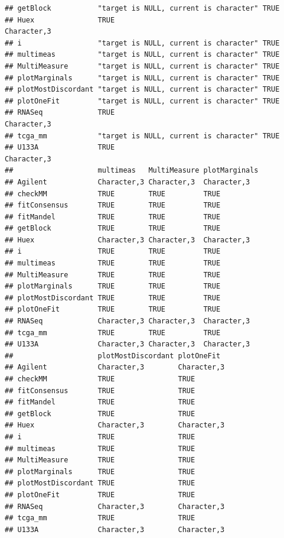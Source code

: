 \documentclass{article}\usepackage[]{graphicx}\usepackage[]{color}
\makeatletter
\newenvironment{kframe}{%
 \def\at@end@of@kframe{}%
 \ifinner\ifhmode%
  \def\at@end@of@kframe{\end{minipage}}%
  \begin{minipage}{\columnwidth}%
 \fi\fi%
 \def\FrameCommand##1{\hskip\@totalleftmargin \hskip-\fboxsep
 \colorbox{shadecolor}{##1}\hskip-\fboxsep
     \hskip-\linewidth \hskip-\@totalleftmargin \hskip\columnwidth}%
 \MakeFramed {\advance\hsize-\width
   \@totalleftmargin\z@ \linewidth\hsize
   \@setminipage}}%
 {\par\unskip\endMakeFramed%
 \at@end@of@kframe}
\newenvironment{knitrout}{}{} %
\makeatother
\begin{document}
\begin{knitrout}
\begin{kframe}
\begin{verbatim}
## getBlock           "target is NULL, current is character" TRUE       
## Huex               TRUE                                   Character,3
## i                  "target is NULL, current is character" TRUE       
## multimeas          "target is NULL, current is character" TRUE       
## MultiMeasure       "target is NULL, current is character" TRUE       
## plotMarginals      "target is NULL, current is character" TRUE       
## plotMostDiscordant "target is NULL, current is character" TRUE       
## plotOneFit         "target is NULL, current is character" TRUE       
## RNASeq             TRUE                                   Character,3
## tcga_mm            "target is NULL, current is character" TRUE       
## U133A              TRUE                                   Character,3
##                    multimeas   MultiMeasure plotMarginals
## Agilent            Character,3 Character,3  Character,3  
## checkMM            TRUE        TRUE         TRUE         
## fitConsensus       TRUE        TRUE         TRUE         
## fitMandel          TRUE        TRUE         TRUE         
## getBlock           TRUE        TRUE         TRUE         
## Huex               Character,3 Character,3  Character,3  
## i                  TRUE        TRUE         TRUE         
## multimeas          TRUE        TRUE         TRUE         
## MultiMeasure       TRUE        TRUE         TRUE         
## plotMarginals      TRUE        TRUE         TRUE         
## plotMostDiscordant TRUE        TRUE         TRUE         
## plotOneFit         TRUE        TRUE         TRUE         
## RNASeq             Character,3 Character,3  Character,3  
## tcga_mm            TRUE        TRUE         TRUE         
## U133A              Character,3 Character,3  Character,3  
##                    plotMostDiscordant plotOneFit 
## Agilent            Character,3        Character,3
## checkMM            TRUE               TRUE       
## fitConsensus       TRUE               TRUE       
## fitMandel          TRUE               TRUE       
## getBlock           TRUE               TRUE       
## Huex               Character,3        Character,3
## i                  TRUE               TRUE       
## multimeas          TRUE               TRUE       
## MultiMeasure       TRUE               TRUE       
## plotMarginals      TRUE               TRUE       
## plotMostDiscordant TRUE               TRUE       
## plotOneFit         TRUE               TRUE       
## RNASeq             Character,3        Character,3
## tcga_mm            TRUE               TRUE       
## U133A              Character,3        Character,3

\end{verbatim}
\end{kframe}
\end{knitrout}
\end{document}
